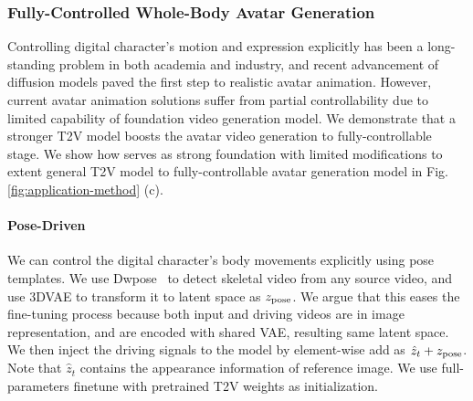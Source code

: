 \subsubsection{Fully-Controlled Whole-Body Avatar Generation} Controlling digital character's motion and expression explicitly has been a long-standing problem in both academia and industry, and recent advancement of diffusion models paved the first step to realistic avatar animation. However, current avatar animation solutions suffer from partial controllability due to limited capability of foundation video generation model. We demonstrate that a stronger T2V model boosts the avatar video generation to fully-controllable stage. We show how {\nameofmethod} serves as strong foundation with limited modifications to extent general T2V model to fully-controllable avatar generation model in Fig. \ref{fig:application-method} (c).

\paragraph{Pose-Driven}
We can control the digital character's body movements explicitly using pose templates. We use Dwpose~\cite{yang2023effective} to detect skeletal video from any source video, and use 3DVAE to transform it to latent space as $z_{\rm pose}$. We argue that this eases the fine-tuning process because both input and driving videos are in image representation, and are encoded with shared VAE, resulting same latent space. We then inject the driving signals to the model by element-wise add as $\hat{z}_t + z_{\rm pose}$. Note that $\hat{z}_t$ contains the appearance information of reference image. We use full-parameters finetune with pretrained T2V weights as initialization. 

